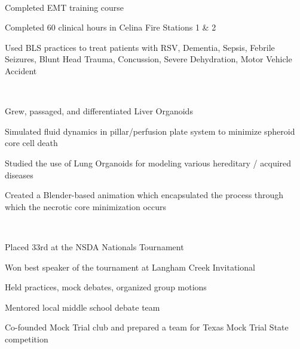 \documentclass[a4paper]{MagicalCV}
\begin{document}
\begin{flushleft}

 \\
\vspace{\topsep} %
\begin{tightemize}
\item Completed EMT training course
\item Completed 60 clinical hours in Celina Fire Stations 1 \& 2
\item Used BLS practices to treat patients with RSV, Dementia, Sepsis, Febrile Seizures, Blunt Head Trauma, Concussion, Severe Dehydration, Motor Vehicle Accident
\end{tightemize}
\sectionsep

 \\
\vspace{\topsep} %
\begin{tightemize}
\item Grew, passaged, and differentiated Liver Organoids
\item Simulated fluid dynamics in pillar/perfusion plate system to minimize spheroid core cell death
\item Studied the use of Lung Organoids for modeling various hereditary / acquired diseases
\item Created a Blender-based animation which encapsulated the process through which the necrotic core minimization occurs
\end{tightemize}
\sectionsep 

 \\
\vspace{\topsep} %
\begin{tightemize}
\item Placed 33rd at the NSDA Nationals Tournament
\item  Won best speaker of the tournament at Langham Creek Invitational
\item Held practices, mock debates, organized group motions
\item Mentored local middle school debate team
\item Co-founded Mock Trial club and prepared a team for Texas Mock Trial State competition
\end{tightemize}
\sectionsep 


\end{flushleft}
\end{document}
